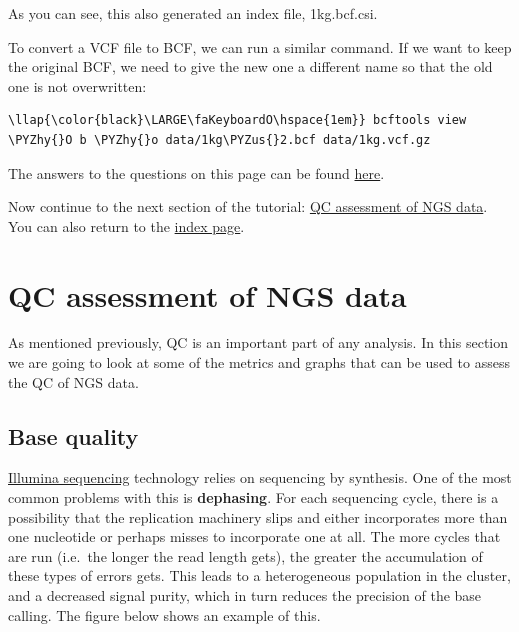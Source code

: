 \documentclass[11pt]{article}
\def\PYZus{\char`\_}
\def\PYZhy{\char`\-}
\begin{document}
    As you can see, this also generated an index file, 1kg.bcf.csi.

    To convert a VCF file to BCF, we can run a similar command. If we want
to keep the original BCF, we need to give the new one a different name
so that the old one is not overwritten:

\begin{terminalinput}
\begin{Verbatim}[commandchars=\\\{\}]
\llap{\color{black}\LARGE\faKeyboardO\hspace{1em}} bcftools view \PYZhy{}O b \PYZhy{}o data/1kg\PYZus{}2.bcf data/1kg.vcf.gz
\end{Verbatim}
\end{terminalinput}

    The answers to the questions on this page can be found
\href{conversion-answers.ipynb}{here}.

Now continue to the next section of the tutorial:
\href{assessment.ipynb}{QC assessment of NGS data}.\\
You can also return to the \href{index.ipynb}{index page}.





\newpage






    \hypertarget{qc-assessment-of-ngs-data}{%
\section{QC assessment of NGS data}\label{qc-assessment-of-ngs-data}}

As mentioned previously, QC is an important part of any analysis. In
this section we are going to look at some of the metrics and graphs that
can be used to assess the QC of NGS data.

\hypertarget{base-quality}{%
\subsection{Base quality}\label{base-quality}}

\href{https://en.wikipedia.org/wiki/Illumina_dye_sequencing}{Illumina
sequencing} technology relies on sequencing by synthesis. One of the
most common problems with this is \textbf{dephasing}. For each
sequencing cycle, there is a possibility that the replication machinery
slips and either incorporates more than one nucleotide or perhaps misses
to incorporate one at all. The more cycles that are run (i.e.~the longer
the read length gets), the greater the accumulation of these types of
errors gets. This leads to a heterogeneous population in the cluster,
and a decreased signal purity, which in turn reduces the precision of
the base calling. The figure below shows an example of this.
\end{document}
